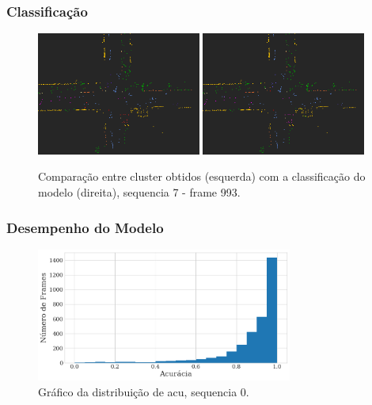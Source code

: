 \documentclass[aspectratio=169,t,xcolor=table]{beamer}
\begin{document}
\begin{frame}
    \frametitle{Classificação}
    \begin{figure}
        \centering
        \includegraphics[width=0.48\textwidth]{figs/final-true2t.png}
        \hspace{0.02\textwidth}
        \includegraphics[width=0.48\textwidth]{figs/final-predt.png}
        \caption {Comparação entre cluster obtidos (esquerda) com a
            classificação do modelo (direita), sequencia 7 - frame 993.}
    \end{figure}
\end{frame}

\begin{frame}
    \frametitle{Desempenho do Modelo}
    \begin{figure}
        \centering
        \includegraphics[width=0.75\textwidth]{figs/plot-6.png}
        \caption {Gráfico da distribuição de acu, sequencia 0.}
    \end{figure}
\end{frame}
\end{document}
